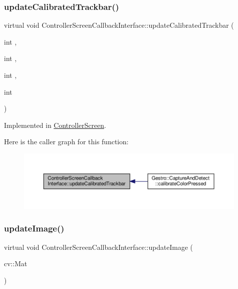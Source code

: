 \subsubsection{\texorpdfstring{update\+Calibrated\+Trackbar()}{updateCalibratedTrackbar()}}
{\footnotesize\ttfamily virtual void Controller\+Screen\+Callback\+Interface\+::update\+Calibrated\+Trackbar (\begin{DoxyParamCaption}\item[{int}]{,  }\item[{int}]{,  }\item[{int}]{,  }\item[{int}]{ }\end{DoxyParamCaption})\hspace{0.3cm}{\ttfamily [pure virtual]}}



Implemented in \hyperlink{class_controller_screen_a700c8c1911e68861b86890a5429d2692}{Controller\+Screen}.

Here is the caller graph for this function\+:
\nopagebreak
\begin{figure}[H]
\begin{center}
\leavevmode
\includegraphics[width=350pt]{class_controller_screen_callback_interface_aeee7c043e83e959de0788a9d2a5f70bb_icgraph}
\end{center}
\end{figure}
\mbox{\label{class_controller_screen_callback_interface_a7d11a5d40ead88e7f89b8b1ee836b0cd}} 
\subsubsection{\texorpdfstring{update\+Image()}{updateImage()}}
{\footnotesize\ttfamily virtual void Controller\+Screen\+Callback\+Interface\+::update\+Image (\begin{DoxyParamCaption}\item[{cv\+::\+Mat}]{ }\end{DoxyParamCaption})\hspace{0.3cm}{\ttfamily [pure virtual]}}

